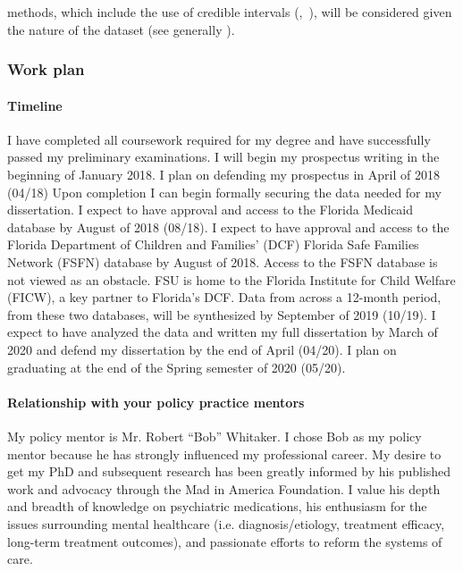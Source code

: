 \documentclass[twocolumn, serif, rga, authordate]{jote-article}
\begin{document}
methods, which include the use of credible intervals (,~\citeyear{Hoekstra2014}), will be considered given the nature of
the dataset (see generally  \citeyear{Berk1995}).


\subsubsection*{Work plan}



\paragraph{Timeline}


I have completed all coursework required for my degree and have
successfully passed my preliminary examinations. I will begin my
prospectus writing in the beginning of January 2018. I plan on defending
my prospectus in April of 2018 (04/18) Upon completion I can begin
formally securing the data needed for my dissertation. I expect to have
approval and access to the Florida Medicaid database by August of 2018
(08/18). I expect to have approval and access to the Florida Department
of Children and Families' (DCF) Florida Safe Families Network (FSFN)
database by August of 2018. Access to the FSFN database is not viewed as
an obstacle. FSU is home to the Florida Institute for Child Welfare
(FICW), a key partner to Florida's DCF. Data from across a 12-month
period, from these two databases, will be synthesized by September of
2019 (10/19). I expect to have analyzed the data and written my full
dissertation by March of 2020 and defend my dissertation by the end of
April (04/20). I plan on graduating at the end of the Spring semester of
2020 (05/20).


\paragraph{Relationship with your policy practice mentors}


My policy mentor is Mr. Robert ``Bob'' Whitaker. I chose Bob as my
policy mentor because he has strongly influenced my professional career.
My desire to get my PhD and subsequent research has been greatly
informed by his published work and advocacy through the Mad in America
Foundation. I value his depth and breadth of knowledge on psychiatric
medications, his enthusiasm for the issues surrounding mental healthcare
(i.e. diagnosis/etiology, treatment efficacy, long-term treatment
outcomes), and passionate efforts to reform the systems of care.
\end{document}
